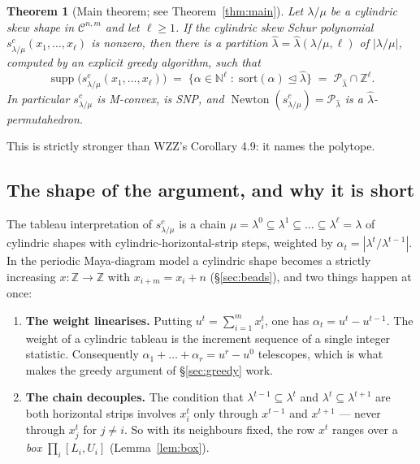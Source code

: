 \documentclass[11pt]{article}
\theoremstyle{plain}
\newtheorem{thm}{Theorem}[section]
\theoremstyle{definition}
\DeclareMathOperator{\supp}{supp}
\DeclareMathOperator{\Newton}{Newton}
\newcommand{\Z}{\mathbb{Z}}
\newcommand{\N}{\mathbb{N}}
\newcommand{\cyl}{\mathcal{C}}
\begin{document}
\begin{thm}[Main theorem; see Theorem~\ref{thm:main}]\label{thm:intro}
Let $\lambda/\mu$ be a cylindric skew shape in $\cyl^{n,m}$ and let $\ell\ge 1$. If the
cylindric skew Schur polynomial $s^{c}_{\lambda/\mu}(x_1,\dots,x_\ell)$ is nonzero, then there
is a partition $\hat\lambda=\hat\lambda(\lambda/\mu,\ell)$ of $|\lambda/\mu|$, computed by an
explicit greedy algorithm, such that
\[
  \supp\bigl(s^{c}_{\lambda/\mu}(x_1,\dots,x_\ell)\bigr)
  \;=\;\{\alpha\in\N^{\ell}\;:\;\mathrm{sort}(\alpha)\trianglelefteq\hat\lambda\}
  \;=\;\mathcal{P}_{\hat\lambda}\cap\Z^{\ell}.
\]
In particular $s^{c}_{\lambda/\mu}$ is M-convex, is SNP, and
$\Newton(s^{c}_{\lambda/\mu})=\mathcal{P}_{\hat\lambda}$ is a $\hat\lambda$-permutahedron.
\end{thm}

This is strictly stronger than WZZ's Corollary 4.9: it names the polytope.

\subsection{The shape of the argument, and why it is short}

The tableau interpretation of $s^{c}_{\lambda/\mu}$ is a chain
$\mu=\lambda^0\subseteq\lambda^1\subseteq\dots\subseteq\lambda^\ell=\lambda$ of cylindric
shapes with cylindric-horizontal-strip steps, weighted by
$\alpha_t=|\lambda^{t}/\lambda^{t-1}|$. In the periodic Maya-diagram model a cylindric shape
becomes a strictly increasing $x:\Z\to\Z$ with $x_{i+m}=x_i+n$ (\S\ref{sec:beads}), and two
things happen at once:

\begin{enumerate}
\item[(i)] \textbf{The weight linearises.} Putting $u^{t}=\sum_{i=1}^{m}x^{t}_i$, one has
$\alpha_t=u^{t}-u^{t-1}$. The weight of a cylindric tableau is the increment sequence of a
single integer statistic. Consequently $\alpha_1+\dots+\alpha_r=u^{r}-u^{0}$ telescopes, which
is what makes the greedy argument of \S\ref{sec:greedy} work.
\item[(ii)] \textbf{The chain decouples.} The condition that $\lambda^{t-1}\subseteq\lambda^t$
and $\lambda^t\subseteq\lambda^{t+1}$ are both horizontal strips involves $x^t_i$ only through
$x^{t-1}$ and $x^{t+1}$ --- never through $x^t_j$ for $j\ne i$. So with its neighbours fixed,
the row $x^t$ ranges over a \emph{box} $\prod_i[L_i,U_i]$ (Lemma~\ref{lem:box}).
\end{enumerate}
\end{document}

